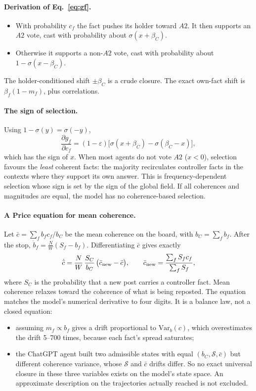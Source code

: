 \documentclass[10pt,a4paper]{article}
\theoremstyle{definition}
\newcommand{\Sus}{\mathcal S}
\begin{document}
\paragraph{Derivation of Eq.~\eqref{eq:gf}.}
\begin{itemize}
\item With probability $c_f$ the fact pushes its holder toward $A2$. It then supports an $A2$ vote, cast with
  probability about $\sigma(x+\beta_C)$.
\item Otherwise it supports a non-$A2$ vote, cast with probability about $1-\sigma(x-\beta_C)$.
\end{itemize}
The holder-conditioned shift $\pm\beta_C$ is a crude closure. The exact own-fact shift is $\beta_f(1-m_f)$, plus
correlations.

\paragraph{The sign of selection.} Using $1-\sigma(y)=\sigma(-y)$,
\begin{equation}
\frac{\partial g_f}{\partial c_f}=(1-\varepsilon)\big[\sigma(x+\beta_C)-\sigma(\beta_C-x)\big],
\end{equation}
which has the sign of $x$. When most agents do not vote $A2$ ($x<0$), selection favours the \emph{least} coherent
facts: the majority recirculates controller facts in the contexts where they support its own answer. This is
frequency-dependent selection whose sign is set by the sign of the global field. If all coherences and magnitudes are
equal, the model has no coherence-based selection.

\paragraph{A Price equation for mean coherence.} Let $\bar c=\sum_f b_fc_f/b_C$ be the mean coherence on the board,
with $b_C=\sum_fb_f$. After the stop, $\dot b_f=\frac NW(S_f-b_f)$. Differentiating $\bar c$ gives exactly
\begin{equation}
\dot{\bar c}=\frac NW\,\frac{S_C}{b_C}\,\big(\bar c_{\rm new}-\bar c\big),\qquad
\bar c_{\rm new}=\frac{\sum_fS_fc_f}{\sum_fS_f},
\end{equation}
where $S_C$ is the probability that a new post carries a controller fact. Mean coherence relaxes toward the coherence of
what is being reposted. The equation matches the model's numerical derivative to four digits. It is a balance law, not
a closed equation:
\begin{itemize}
\item assuming $m_f\propto b_f$ gives a drift proportional to $\mathrm{Var}_b(c)$, which overestimates the drift 5--700
  times, because each fact's spread saturates;
\item the ChatGPT agent built two admissible states with equal $(b_C,\Sus,\bar c)$ but different coherence variance,
  whose $\Sus$ and $\bar c$ drifts differ. So no exact universal closure in these three variables exists on the
  model's state space. An approximate description on the trajectories actually reached is not excluded.
\end{itemize}
\end{document}
